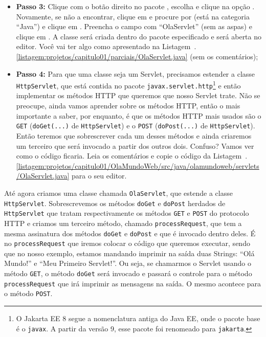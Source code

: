 \begin{itemize}
    \item \textbf{Passo 3:} Clique com o botão direito no pacote  , escolha  e clique na opção . Novamente, se não a encontrar, clique em  e procure por  (está na categoria ``Java'') e clique em . Preencha o campo  com ``OlaServlet'' (sem as aspas) e clique em . A classe será criada dentro do pacote especificado e será aberta no editor. Você vai ter algo como apresentado na Listagem~\thechapter.\ref{listagem:projetos/capitulo01/parciais/OlaServlet.java} (sem os comentários);
    
    
    \item \textbf{Passo 4:} Para que uma classe seja um Servlet, precisamos estender a classe \texttt{HttpServlet}, que está contida no pacote \texttt{javax.servlet.http}\footnote{O Jakarta EE 8 segue a nomenclatura antiga do Java EE, onde o pacote base é o \texttt{javax}. A partir da versão 9, esse pacote foi renomeado para \texttt{jakarta}.} e então implementar os métodos HTTP que queremos que nosso Servlet trate. Não se preocupe, ainda vamos aprender sobre os métodos HTTP, então o mais importante a saber, por enquanto, é que os métodos HTTP mais usados são o  \texttt{GET} (\texttt{doGet(...)} de \texttt{HttpServlet}) e o  \texttt{POST} (\texttt{doPost(...)} de  \texttt{HttpServlet}). Então teremos que sobrescrever cada um desses métodos e ainda criaremos um terceiro que será invocado a partir dos outros dois. Confuso? Vamos ver como o código ficaria. Leia os comentários e copie o código da Listagem~\thechapter.\ref{listagem:projetos/capitulo01/OlaMundoWeb/src/java/olamundoweb/servlets/OlaServlet.java} para o seu editor.
    
\end{itemize}

\FloatBarrier
{}
\FloatBarrier
    
Até agora criamos uma classe chamada  \texttt{OlaServlet}, que estende a classe \texttt{HttpServlet}. Sobrescrevemos os métodos \texttt{doGet} e \texttt{doPost} herdados de \texttt{HttpServlet} que tratam respectivamente os métodos \texttt{GET} e \texttt{POST} do protocolo HTTP e criamos um terceiro método, chamado \texttt{processRequest}, que tem a mesma assinatura dos métodos \texttt{doGet} e \texttt{doPost} e que é invocado dentro deles. É no \texttt{processRequest} que iremos colocar o código que queremos executar, sendo que no nosso exemplo, estamos mandando imprimir na saída duas Strings: ``Olá Mundo!'' e ``Meu Primeiro Servlet!''. Ou seja, se chamarmos o Servlet usando o método \texttt{GET}, o método \texttt{doGet} será invocado e passará o controle para o método \texttt{processRequest} que irá imprimir as mensagens na saída. O mesmo acontece para o método \texttt{POST}.

